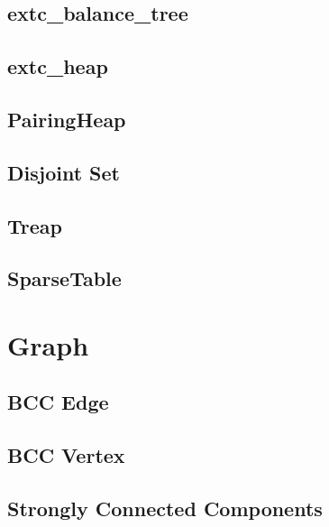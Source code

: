 \documentclass[a4paper,10pt,twocolumn,oneside]{article}
\begin{document}
\subsection{extc\_balance\_tree}


\subsection{extc\_heap}


\subsection{PairingHeap}


\subsection{Disjoint Set}


\subsection{Treap}


\subsection{SparseTable}


\section{Graph}

\subsection{BCC Edge}


\subsection{BCC Vertex}


\subsection{Strongly Connected Components}

\end{document}
